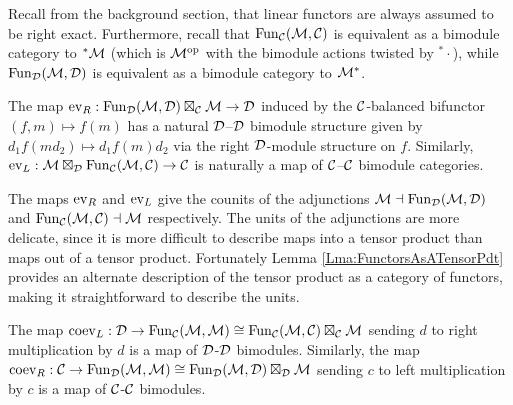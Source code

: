 \documentclass{amsart}
\begin{document}
Recall from the background section, that linear functors are always assumed to be right exact.  Furthermore, recall that $\operatorname{Fun}_{{\mathcal C}}(\mathcal M, \mathcal C)$ is equivalent as a bimodule category to ${}^*\mathcal M$ (which is $\mathcal M^{\mathrm{op}}$ with the bimodule actions twisted by ${}^*\cdot$), while $\operatorname{Fun}_{\mathcal D}(\mathcal M, \mathcal D)$ is equivalent as a bimodule category to $\mathcal M^*$.

\begin{lemma}
The map $\mathrm{ev}_R: \operatorname{Fun}_{{\mathcal D}}(\mathcal M, \mathcal D) \boxtimes_{\mathcal C} \mathcal M \rightarrow \mathcal D$ induced by the $\mathcal C$-balanced bifunctor $(f,m) \mapsto f(m)$ has a natural $\mathcal D$--$\mathcal D$ bimodule structure given by $d_1 f(m d_2)  \mapsto d_1 f(m) d_2$ via the right $\mathcal D$-module structure on $f$.  Similarly, $\mathrm{ev}_L: \mathcal M \boxtimes_{\mathcal D} \operatorname{Fun}_{\mathcal C}(\mathcal M, \mathcal C) \rightarrow \mathcal C$ is naturally a map of $\mathcal C$--$\mathcal C$ bimodule categories.
\end{lemma} 

The maps $\mathrm{ev}_R$ and $\mathrm{ev}_L$ give the counits of the adjunctions $\mathcal M \dashv \operatorname{Fun}_{{\mathcal D}}(\mathcal M, \mathcal D)$ and $\operatorname{Fun}_{\mathcal C}(\mathcal M,\mathcal C) \dashv \mathcal M$ respectively.  The units of the adjunctions are more delicate, since it is more difficult to describe maps into a tensor product than maps out of a tensor product. Fortunately Lemma \ref{Lma:FunctorsAsATensorPdt} provides an alternate description of the tensor product as a category of functors, making it straightforward  to describe the units.


\begin{lemma}
The map $\mathrm{coev}_L: \mathcal D \rightarrow \operatorname{Fun}_{\mathcal C}(\mathcal M,\mathcal M) \cong \operatorname{Fun}_{\mathcal C}(\mathcal M,\mathcal C) \boxtimes_\mathcal C \mathcal M$ sending $d$ to right multiplication by $d$ is a map of $\mathcal D$-$\mathcal D$ bimodules.  Similarly, the map $\mathrm{coev}_R: \mathcal C \rightarrow \operatorname{Fun}_{\mathcal D}(\mathcal M,\mathcal M) \cong \operatorname{Fun}_{\mathcal D}(\mathcal M,\mathcal D) \boxtimes_\mathcal D \mathcal M$ sending $c$ to left multiplication by $c$ is a map of $\mathcal C$-$\mathcal C$ bimodules.
\end{lemma}
\end{document}
